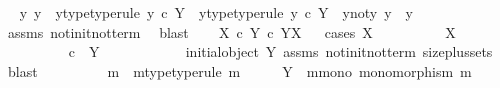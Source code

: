 \begin{isabellebody}
\ \isamarkupfalse%
\ y{}\ y{}\ \ y{}{\isacharunderscore}{\kern0pt}type{\isacharbrackleft}{\kern0pt}type{\isacharunderscore}{\kern0pt}rule{\isacharbrackright}{\kern0pt}{\isacharcolon}{\kern0pt}\ {\isachardoublequoteopen}y{}\ {\isasymin}\isactrlsub c\ Y{\isachardoublequoteclose}\ \ y{}{\isacharunderscore}{\kern0pt}type{\isacharbrackleft}{\kern0pt}type{\isacharunderscore}{\kern0pt}rule{\isacharbrackright}{\kern0pt}{\isacharcolon}{\kern0pt}\ {\isachardoublequoteopen}y{}\ {\isasymin}\isactrlsub c\ Y{\isachardoublequoteclose}\ \ y{}{\isacharunderscore}{\kern0pt}not{\isacharunderscore}{\kern0pt}y{}{\isacharcolon}{\kern0pt}\ {\isachardoublequoteopen}y{}\ {\isasymnoteq}\ y{}{\isachardoublequoteclose}\isanewline
\ \ \ \ \isamarkupfalse%
\ assms\ not{\isacharunderscore}{\kern0pt}init{\isacharunderscore}{\kern0pt}not{\isacharunderscore}{\kern0pt}term\ \isamarkupfalse%
\ blast\isanewline
\ \ \isamarkupfalse%
\ {\isachardoublequoteopen}X\ {\isasymtimes}\isactrlsub c\ Y\ {\isasymle}\isactrlsub c\ Y\isactrlbsup X\isactrlesup {\isachardoublequoteclose}\isanewline
\ \ \isamarkupfalse%
{\isacharparenleft}{\kern0pt}cases\ {\isachardoublequoteopen}X\ {\isasymcong}\ {\isasymOmega}{\isachardoublequoteclose}{\isacharparenright}{\kern0pt}\isanewline
\ \ \ \ \ \ \isamarkupfalse%
\ {\isachardoublequoteopen}X\ {\isasymcong}\ {\isasymOmega}{\isachardoublequoteclose}\isanewline
\ \ \ \ \ \ \isamarkupfalse%
\ {\isachardoublequoteopen}{\isasymOmega}\ \ {\isasymle}\isactrlsub c\ \ Y{\isachardoublequoteclose}\isanewline
\ \ \ \ \ \ \ \ \ \isamarkupfalse%
\ {\isacartoucheopen}{\isasymnot}\ initial{\isacharunderscore}{\kern0pt}object\ Y{\isacartoucheclose}\ assms\ not{\isacharunderscore}{\kern0pt}init{\isacharunderscore}{\kern0pt}not{\isacharunderscore}{\kern0pt}term\ size{\isacharunderscore}{\kern0pt}{}plus{\isacharunderscore}{\kern0pt}sets\ \isamarkupfalse%
\ blast\isanewline
\ \ \ \ \ \ \isamarkupfalse%
\ \isamarkupfalse%
\ m\ \ m{\isacharunderscore}{\kern0pt}type{\isacharbrackleft}{\kern0pt}type{\isacharunderscore}{\kern0pt}rule{\isacharbrackright}{\kern0pt}{\isacharcolon}{\kern0pt}\ {\isachardoublequoteopen}m\ {\isacharcolon}{\kern0pt}\ {\isasymOmega}\ \ {\isasymrightarrow}\ \ Y{\isachardoublequoteclose}\ \ m{\isacharunderscore}{\kern0pt}mono{\isacharcolon}{\kern0pt}\ {\isachardoublequoteopen}monomorphism\ m{\isachardoublequoteclose}\isanewline

\end{isabellebody}
